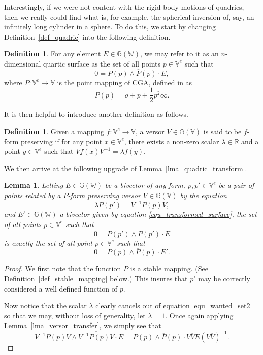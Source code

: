 \documentclass{birkjour}
\newtheorem{lem}[thm]{Lemma}
\theoremstyle{definition}
\newtheorem{defn}[thm]{Definition}
\theoremstyle{remark}
\numberwithin{equation}{section}
\newcommand{\G}{\mathbb{G}}
\newcommand{\V}{\mathbb{V}}
\newcommand{\W}{\mathbb{W}}
\newcommand{\R}{\mathbb{R}}
\newcommand{\nvao}{o}
\newcommand{\nvai}{\infty}
\begin{document}
Interestingly, if we were not content with the rigid body motions of
quadrics, then we really could find what is, for example, the spherical
inversion of, say, an infinitely long cylinder in a sphere.  To do this, we start by changing
Definition~\ref{def_quadric} into the following definition.
\begin{defn}\label{def_surface}
For any element $E\in\G(\W)$, we may refer to it as an $n$-dimensional
quartic surface as the set of all points $p\in\V^e$ such that
\begin{equation}\label{equ_surface_set}
0 = P(p)\wedge\overline{P}(p)\cdot E,
\end{equation}
where $P:\V^e\to\V$ is the point mapping of CGA, defined in \cite{Hestenes01} as
\begin{equation}\label{equ_cga_point_map}
P(p) = \nvao + p + \frac{1}{2}p^2\nvai.
\end{equation}
\end{defn}
It is then helpful to introduce another definition as follows.
\begin{defn}\label{def_preserve_point_map}
Given a mapping $f:\V^e\to\V$, a versor $V\in\G(\V)$ is said to be $f$-form preserving if for
any point $x\in\V^e$, there exists a non-zero scalar $\lambda\in\R$ and
a point $y\in\V^e$ such that $Vf(x)V^{-1}=\lambda f(y)$.
\end{defn}
We then arrive at the following upgrade of Lemma~\ref{lma_quadric_transform}.
\begin{lem}\label{lma_quartic_transform}
Letting $E\in\G(\W)$ be a bivector of any form, $p,p'\in\V^e$ be
a pair of points related by a $P$-form preserving versor $V\in\G(\V)$ by
the equation
\begin{equation}
\lambda P(p') = V^{-1}P(p)V,
\end{equation}
and $E'\in\G(\W)$ a bivector given by equation \eqref{equ_transformed_surface},
the set of all points $p\in\V^e$ such that
\begin{equation}\label{equ_wanted_set2}
0 = P(p')\wedge\overline{P}(p')\cdot E
\end{equation}
is exactly the set of all point $p\in\V^e$ such that
\begin{equation}
0 = P(p)\wedge\overline{P}(p)\cdot E'.
\end{equation}
\end{lem}
\begin{proof}
We first note that the function $P$ is a stable mapping.  (See Definition~\ref{def_stable_mapping} below.)
This insures that $p'$ may be correctly considered a well defined function of $p$.

Now notice that the scalar $\lambda$ clearly cancels out of equation \eqref{equ_wanted_set2} so that we may,
without loss of generality, let $\lambda=1$.
Once again applying Lemma~\ref{lma_versor_transfer}, we simply see that
\begin{equation}
V^{-1}P(p)V\wedge\overline{V^{-1}P(p)V}\cdot E = P(p)\wedge\overline{P}(p)\cdot V\overline{V}E(V\overline{V})^{-1}.
\end{equation}
\end{proof}
\end{document}
